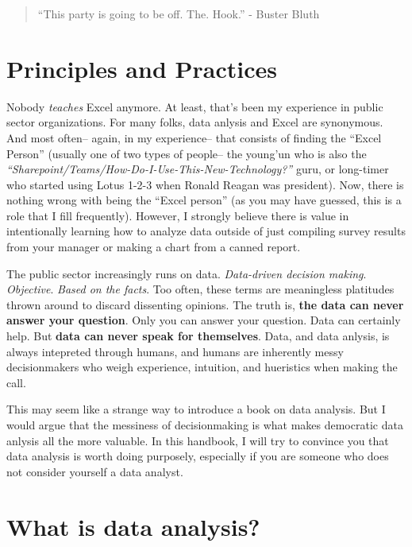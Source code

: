 \documentclass[]{book}
\begin{document}
\begin{quote}
``This party is going to be off. The. Hook.'' - Buster Bluth
\end{quote}

\hypertarget{principles-and-practices}{%
\section{Principles and Practices}\label{principles-and-practices}}

Nobody \emph{teaches} Excel anymore. At least, that's been my experience in public sector organizations. For many folks, data anlysis and Excel are synonymous. And most often-- again, in my experience-- that consists of finding the ``Excel Person'' (usually one of two types of people-- the young'un who is also the \emph{``Sharepoint/Teams/How-Do-I-Use-This-New-Technology?''} guru, or long-timer who started using Lotus 1-2-3 when Ronald Reagan was president). Now, there is nothing wrong with being the ``Excel person'' (as you may have guessed, this is a role that I fill frequently). However, I strongly believe there is value in intentionally learning how to analyze data outside of just compiling survey results from your manager or making a chart from a canned report.

The public sector increasingly runs on data. \emph{Data-driven decision making}. \emph{Objective}. \emph{Based on the facts}. Too often, these terms are meaningless platitudes thrown around to discard dissenting opinions. The truth is, \textbf{the data can never answer your question}. Only you can answer your question. Data can certainly help. But \textbf{data can never speak for themselves}. Data, and data anlysis, is always intepreted through humans, and humans are inherently messy decisionmakers who weigh experience, intuition, and hueristics when making the call.

This may seem like a strange way to introduce a book on data analysis. But I would argue that the messiness of decisionmaking is what makes democratic data anlysis all the more valuable. In this handbook, I will try to convince you that data analysis is worth doing purposely, especially if you are someone who does not consider yourself a data analyst.

\hypertarget{what-is-data-analysis}{%
\section{What is data analysis?}\label{what-is-data-analysis}}
\end{document}
